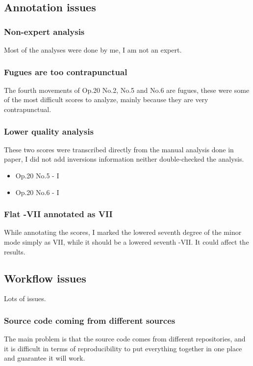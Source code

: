 	\subsection{Annotation issues}
		\subsubsection{Non-expert analysis}
    Most of the analyses were done by me, I am not an expert.
		\subsubsection{Fugues are too contrapunctual}
    The fourth movements of Op.20 No.2, No.5 and No.6 are fugues, these were some of the most difficult scores to analyze, mainly because they are very contrapunctual.
		\subsubsection{Lower quality analysis}
    These two scores were transcribed directly from the manual analysis done in paper, I did not add inversions information neither double-checked the analysis.
    \begin{itemize}
    \item Op.20 No.5 - I
		\item Op.20 No.6 - I
    \end{itemize}
		\subsubsection{Flat -VII annotated as VII}
    While annotating the scores, I marked the lowered seventh degree of the minor mode simply as VII, while it should be a lowered seventh -VII. It could affect the results.
	\subsection{Workflow issues}
    Lots of issues.
		\subsubsection{Source code coming from different sources}
    The main problem is that the source code comes from different repositories, and it is difficult in terms of reproducibility to put everything together in one place and guarantee it will work.
